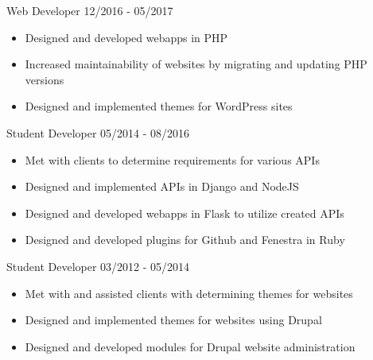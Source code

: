 \documentclass[11pt]{article} %
\begin{document}
\begin{description}
\squish

           {Web Developer}
           {12/2016 - 05/2017}

\begin{itemize}
  \item Designed and developed webapps in PHP
  \item Increased maintainability of websites by migrating and updating PHP
    versions
  \item Designed and implemented themes for WordPress sites
\end{itemize}


           {Student Developer}
           {05/2014 - 08/2016}

\begin{itemize}
  \item Met with clients to determine requirements for various APIs
  \item Designed and implemented APIs in Django and NodeJS
  \item Designed and developed webapps in Flask to utilize created APIs
  \item Designed and developed plugins for Github and Fenestra in Ruby
\end{itemize}

           {Student Developer}
           {03/2012 - 05/2014}

\begin{itemize}
  \item Met with and assisted clients with determining themes for websites
  \item Designed and implemented themes for websites using Drupal 
  \item Designed and developed modules for Drupal website administration
\end{itemize}

\end{description}
\end{document}
